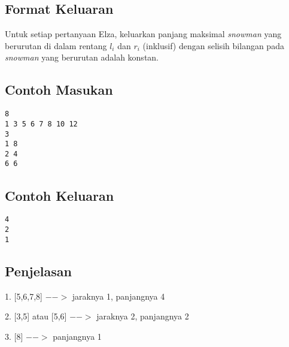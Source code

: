 \documentclass{article}
\begin{document}
\subsection*{Format Keluaran}
Untuk setiap pertanyaan Elza, keluarkan panjang maksimal \textit{snowman} yang berurutan di dalam rentang $l_i$ dan $r_i$ (inklusif) 
dengan selisih bilangan pada \textit{snowman} yang berurutan adalah konstan.
\\

\begin{multicols}{2}
\subsection*{Contoh Masukan}
\begin{lstlisting}
8
1 3 5 6 7 8 10 12
3
1 8
2 4
6 6
\end{lstlisting}
\columnbreak
\subsection*{Contoh Keluaran}
\begin{lstlisting}
4
2
1
\end{lstlisting}
\vfill
\null
\end{multicols}

\subsection*{Penjelasan}
1. [5,6,7,8] $-->$ jaraknya 1, panjangnya 4

2. [3,5] atau [5,6] $-->$ jaraknya 2, panjangnya 2

3. [8] $-->$ panjangnya 1


\pagebreak
\end{document}
